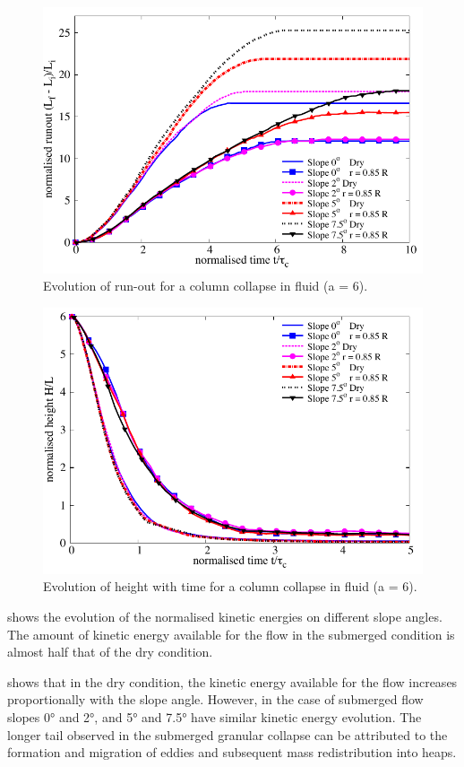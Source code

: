 \documentclass[epj,twocolumn]{webofc}
\begin{document}
\begin{figure}[htbp]
\centering
\includegraphics[width=0.9\linewidth]{figs/runout_a6_slope}
\caption{Evolution of run-out for a column collapse in fluid (a = 6).}
\label{fig:Runout_a6_slope}
\end{figure}

\begin{figure}[htbp]
\centering
\includegraphics[width=0.8\linewidth]{figs/height_a6_slope}
\caption{Evolution of height with time for a column collapse in fluid (a = 6).}
\label{fig:Height_a6_slope}
\end{figure}

 shows the evolution of the normalised
kinetic energies on different slope angles. The 
amount of kinetic energy available for the flow in the submerged condition 
is almost half that of the dry condition.

 shows that in the dry condition, the kinetic energy
available for the flow increases proportionally with the slope angle. However,
in the case of submerged flow slopes 0\si{\degree} and 2\si{\degree},
and 5\si{\degree} and 7.5\si{\degree} have similar kinetic energy evolution.
The longer tail observed in the submerged granular collapse can be attributed to
the formation and migration of eddies and subsequent mass redistribution into heaps.
\end{document}
